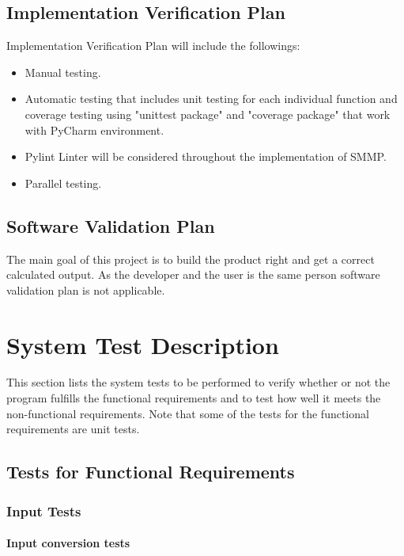\documentclass[12pt, titlepage]{article}
\begin{document}
\subsection{Implementation Verification Plan}

Implementation Verification Plan will include the followings:
\begin{itemize}
\item Manual testing.
\item  Automatic testing that includes unit testing for each individual function and coverage testing using "unittest package" and "coverage package" that work with PyCharm environment.
\item  Pylint Linter will be considered throughout the implementation of SMMP.  
\item Parallel testing. 
\end{itemize}

\subsection{Software Validation Plan}

The main goal of this project is to build the product right and get a correct calculated output. 
As the developer and the user is the same person software validation plan is not applicable.

\section{System Test Description}

This section lists the system tests to be performed to verify whether or not the
program fulfills the functional requirements and to test how well it meets the
non-functional requirements. Note that some of the tests for the functional
requirements are unit tests.

\subsection{Tests for Functional Requirements}


\subsubsection{Input Tests}

		
\paragraph{Input conversion tests}
\end{document}

